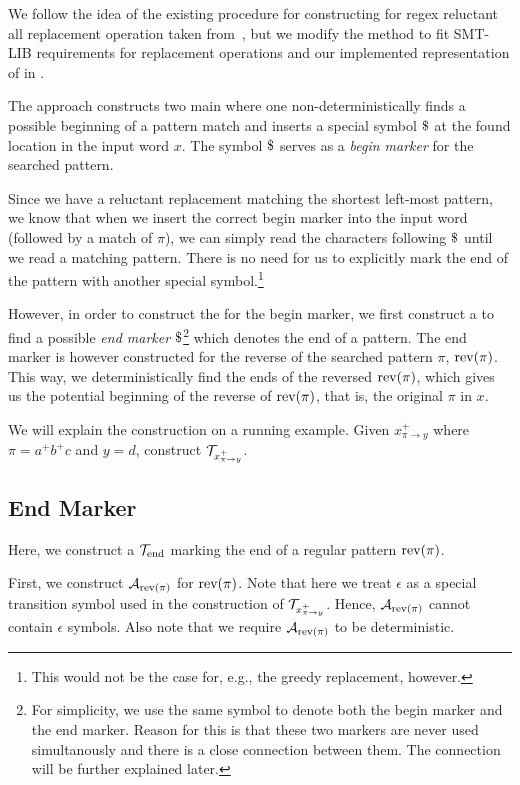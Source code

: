 We follow the idea of the existing procedure for constructing \nft for regex reluctant all replacement operation taken from~\cite{replace_nfts_model_ModelingRegularReplacementForStringConstraintSolving_DBLP:conf/nfm/FuL10}, but we modify the method to fit SMT-LIB requirements for replacement operations and our implemented representation of \nfts in \mata.

The approach constructs two main \nfts where one non-deterministically finds a possible beginning of a pattern match and inserts a special symbol $\marker$ at the found location in the input word $x$. The symbol $\marker$ serves as a \emph{begin marker} for the searched pattern.

Since we have a reluctant replacement matching the shortest left-most pattern, we know that when we insert the correct begin marker into the input word (followed by a match of $\pi$), we can simply read the characters following $\marker$ until we read a matching pattern. There is no need for us to explicitly mark the end of the pattern with another special symbol.\footnote{
  This would not be the case for, e.g., the greedy replacement, however.
}

However, in order to construct the \nft for the begin marker, we first construct a \dft to find a possible \emph{end marker} $\marker$\footnote{For simplicity, we use the same symbol to denote both the begin marker and the end marker. Reason for this is that these two markers are never used simultanously and there is a close connection between them. The connection will be further explained later.} which denotes the end of a pattern.
The end marker \dft is however constructed for the reverse of the searched pattern $\pi$, $\text{rev(}\pi\text{)}$.
This way, we deterministically find the ends of the reversed $\text{rev(}\pi\text{)}$, which gives us the potential beginning of the reverse of $\text{rev(}\pi\text{)}$, that is, the original $\pi$ in $x$.

We will explain the construction on a running example.
Given $x^{+}_{\pi \rightarrow y}$ where $\pi = a^+b^+c$ and $y = d$, construct $\mathcal{T}_{x^{+}_{\pi \rightarrow y}}$.

\subsection{End Marker \dft}
Here, we construct a \dft $\mathcal{T}_{\text{end}}$ marking the end of a regular pattern $\text{rev(}\pi\text{)}$.

First, we construct \dfa $\mathcal{A}_{\text{rev(}\pi\text{)}}$ for $\text{rev(}\pi\text{)}$.
Note that here we treat $\epsilon$ as a special transition symbol used in the construction of $\mathcal{T}_{x^{+}_{\pi \rightarrow y}}$.
Hence, $\mathcal{A}_{\text{rev(}\pi\text{)}}$ cannot contain $\epsilon$ symbols.
Also note that we require $\mathcal{A}_{\text{rev(}\pi\text{)}}$ to be deterministic.

